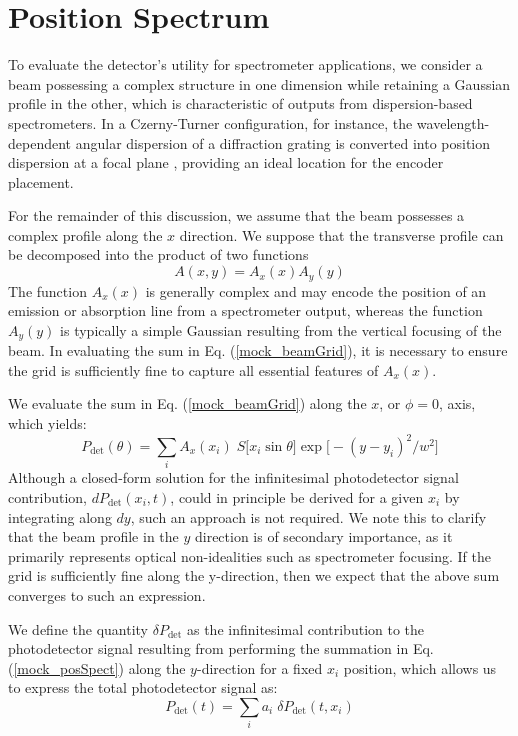 \documentclass[8pt,a4paper]{report}
\begin{document}
	
	\section{Position Spectrum}
	
	To evaluate the detector's utility for spectrometer applications, we consider a beam possessing a complex structure in one dimension while retaining a Gaussian profile in the other, which is characteristic of outputs from dispersion-based spectrometers. In a Czerny-Turner configuration, for instance, the wavelength-dependent angular dispersion of a diffraction grating is converted into position dispersion at a focal plane \cite{book_demtroder_2_experimental}, providing an ideal location for the encoder placement.
	
	For the remainder of this discussion, we assume that the beam possesses a complex profile along the $x$ direction. We suppose that the transverse profile can be decomposed into the product of two functions
	\begin{equation}
		A(x,y) = A_x(x) A_y(y)
	\end{equation}
	The function $A_x(x)$ is generally complex and may encode the position of an emission or absorption line from a spectrometer output, whereas the function $A_y(y)$ is typically a simple Gaussian resulting from the vertical focusing of the beam. In evaluating the sum in Eq. (\ref{mock_beamGrid}), it is necessary to ensure the grid is sufficiently fine to capture all essential features of $A_x(x)$.
	
	We evaluate the sum in Eq. (\ref{mock_beamGrid}) along the $x$, or $\phi=0$, axis, which yields:
	\begin{equation} \label{mock_posSpect}
		P_\mathrm{det}(\theta) = \sum_i A_x(x_i) \; S\Big[ x_i \sin\theta \Big] \exp\Big[-(y-y_i)^2 / w^2\Big]
	\end{equation}
	Although a closed-form solution for the infinitesimal photodetector signal contribution, $dP_\mathrm{det}(x_i, t)$, could in principle be derived for a given $x_i$ by integrating along $dy$, such an approach is not required. We note this to clarify that the beam profile in the $y$ direction is of secondary importance, as it primarily represents optical non-idealities such as spectrometer focusing. If the grid is sufficiently fine along the y-direction, then we expect that the above sum converges to such an expression.
	
	We define the quantity $\delta P_\mathrm{det}$ as the infinitesimal contribution to the photodetector signal resulting from performing the summation in Eq. (\ref{mock_posSpect}) along the $y$-direction for a fixed $x_i$ position, which allows us to express the total photodetector signal as:
	\begin{equation} \label{mock_x_beamlet}
		P_\mathrm{det}(t) = \sum_i a_i \; \delta P_\mathrm{det}(t, x_i)
	\end{equation}
	
\end{document}
